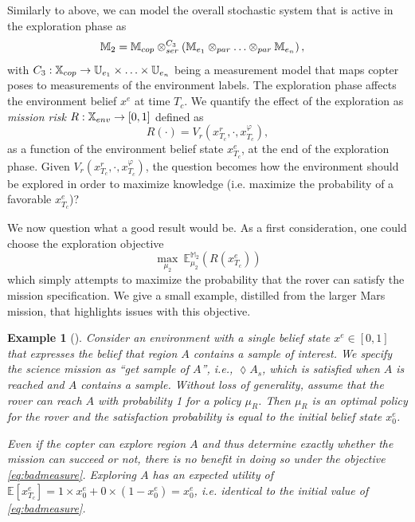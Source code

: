 \documentclass[conference]{IEEEtran}
\newtheorem{example}{Example}
\begin{document}
Similarly to above, we can model the overall stochastic system that is active in the exploration phase as
\begin{equation}
\begin{aligned}
	\mathbb{M}_2 & = \mathbb{M}_{cop} \otimes_{ser}^{C_3} \left( \mathbb{M}_{e_1} \otimes_{par} \ldots \otimes_{par} \mathbb{M}_{e_n} \right),
\end{aligned}
\end{equation}
with $C_3 : \mathbb{X}_{cop} \rightarrow \mathbb{U}_{e_1} \times \ldots \times \mathbb{U}_{e_n}$ being a measurement model that maps copter poses to measurements of the environment labels.
The exploration phase affects the environment belief $x^e$ at time $T_c$. We quantify the effect of the exploration as \emph{mission risk} $R:\mathbb{X}_{env}\rightarrow [0,1]$ defined as
\begin{equation}
	R(\cdot) = V_r(x_{T_c}^r, \cdot, x_{T_c}^\varphi),
\end{equation}
as a function of the environment belief state $x^e_{T_c}$, at the end of the exploration phase. Given $V_r(x_{T_c}^r, \cdot, x_{T_c}^\varphi)$, the question becomes how the environment should be explored in order to maximize knowledge (i.e. maximize the probability of a favorable $x^{e}_{T_c}$)?

We now question what a good result would be. As a first consideration, one could choose the exploration objective
\begin{equation}
\label{eq:badmeasure}
	\max_{\mu_{2}}\  \mathbb E^{\mathbb M_{2}}_{\mu_2} (R(x_{T_c}^e) )
\end{equation}
which simply attempts to maximize the probability that the rover can satisfy the mission specification. We give a small example, distilled from the larger Mars mission, that highlights issues with this objective.

\begin{example}[]
	Consider an environment with a single belief state $x^e\in[0,1]$ that expresses the belief that region $A$ contains a sample of interest.
	We specify the science mission as ``\emph{get  sample of $A$}'', i.e.,  $\lozenge A_s$, which is satisfied when $A$ is reached and $A$ contains a sample.
	Without loss of generality, assume that the rover can reach $A$ with probability 1 for a policy $\mu_R$. Then $\mu_R$ is an optimal policy for the rover and the satisfaction probability is equal to the initial belief state $x^e_{0}$.

  Even if the copter can explore region $A$ and thus determine exactly whether the mission can succeed or not, there is no benefit in doing so under the objective \eqref{eq:badmeasure}. Exploring $A$ has an expected utility of $\mathbb{E} \left[ x_{T_c}^e \right] = 1\times x^e_{0} +  0\times (1- x^e_{0}) = x^e_0$, i.e. identical to the initial value of \eqref{eq:badmeasure}.
\end{example}
\end{document}
